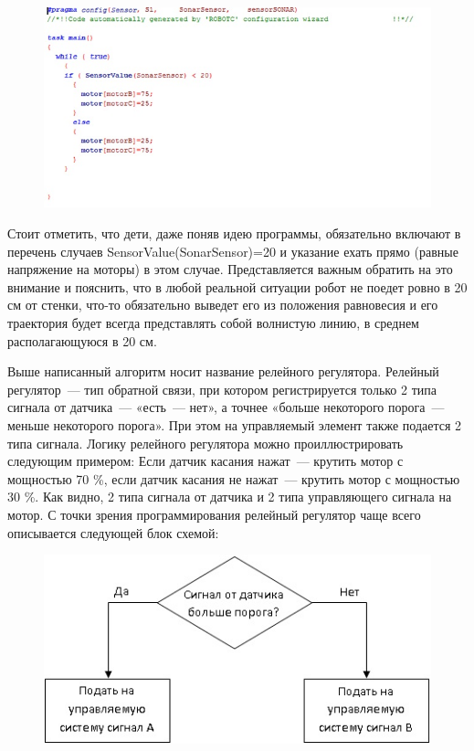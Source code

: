 \begin{figure}[h!]
	\begin{center}
		\includegraphics[width=1\linewidth]{chapters/chapter15/images/4}
		\caption{}
		\label{ris:image15x4}
	\end{center}
\end{figure}

Стоит отметить, что дети, даже поняв идею программы, обязательно включают в перечень случаев SensorValue(SonarSensor)=20 и указание ехать прямо (равные напряжение на моторы)  в этом случае. Представляется важным обратить на это внимание и пояснить, что в любой реальной ситуации робот не поедет ровно в 20 см от стенки, что-то обязательно выведет его из положения равновесия и его траектория будет всегда представлять собой волнистую линию, в среднем располагающуюся в 20 см.

Выше написанный алгоритм носит название релейного регулятора. Релейный регулятор~--- тип обратной связи, при котором регистрируется только 2 типа сигнала от датчика~--- «есть~--- нет», а точнее «больше некоторого порога~--- меньше некоторого порога». При этом на управляемый элемент также подается 2 типа сигнала. Логику релейного регулятора можно проиллюстрировать следующим примером: Если датчик касания нажат~--- крутить мотор с мощностью 70 \%, если датчик касания не нажат~--- крутить мотор с мощностью 30 \%. Как видно, 2 типа сигнала от датчика и 2 типа управляющего сигнала на мотор. С точки зрения программирования релейный регулятор чаще всего описывается следующей блок схемой:

\begin{figure}[h!]
	\begin{center}
		\includegraphics[width=1\linewidth]{chapters/chapter15/images/5}
		\caption{}
		\label{ris:image15x5}
	\end{center}
\end{figure}